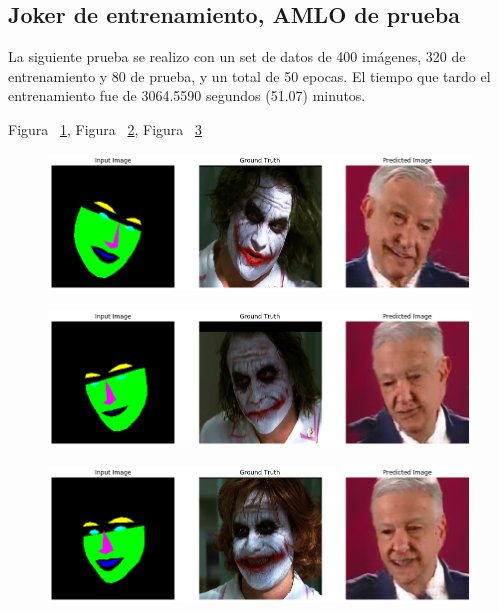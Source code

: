 \documentclass[10pt,journal,compsoc]{IEEEtran}\usepackage[T1]{fontenc}                              %
\begin{document}
\subsection{Joker de entrenamiento, AMLO de prueba}

La siguiente prueba se realizo con un set de datos de 400 imágenes, 320
de entrenamiento y 80 de prueba, y un total de 50 epocas. El tiempo que
tardo el entrenamiento fue de 3064.5590 segundos (51.07) minutos.

Figura ~\ref{fig:17}, Figura ~\ref{fig:18}, Figura ~\ref{fig:19}

\begin{figure}[!htb]
  \begin{center}
    \includegraphics[width=\linewidth]{./imgs/17_01_joker_amlo.png}
    \caption{}
    \label{fig:17}
  \end{center}
\end{figure}

\begin{figure}[!htb]
  \begin{center}
    \includegraphics[width=\linewidth]{./imgs/17_02_joker_amlo.png}
        \caption{}
    \label{fig:18}
  \end{center}
\end{figure}

\begin{figure}[!htb]
  \begin{center}
    \includegraphics[width=\linewidth]{./imgs/17_03_joker_amlo.png}
        \caption{}
    \label{fig:19}
  \end{center}
\end{figure}
\end{document}
